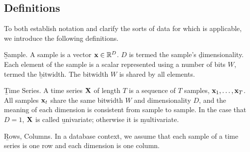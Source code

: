 \subsection{Definitions}

To both establish notation and clarify the sorts of data for which \minesp is applicable, we introduce the following definitions.

\begin{Definition} \b{Sample.} A sample is a vector $\mathbf{x} \in \mathbb{R}^D$. $D$ is termed the sample's \b{dimensionality}. Each element of the sample is a scalar represented using a number of bits $W$, termed the \b{bitwidth}. The bitwidth $W$ is shared by all elements.
\end{Definition}

\begin{Definition} \b{Time Series.} A time series $\mathbf{X}$ of length $T$ is a sequence of $T$ samples, $\mathbf{x}_1,\ldots,\mathbf{x}_T$. All samples $\mathbf{x}_t$ share the same bitwidth $W$ and dimensionality $D$, and the meaning of each dimension is consistent from sample to sample. In the case that $D = 1$, $\mathbf{X}$ is called \b{univariate}; otherwise it is \b{multivariate}.
\end{Definition}

\begin{Definition} \b{Rows, Columns.} In a database context, we assume that each sample of a time series is one row and each dimension is one column.
\end{Definition}



